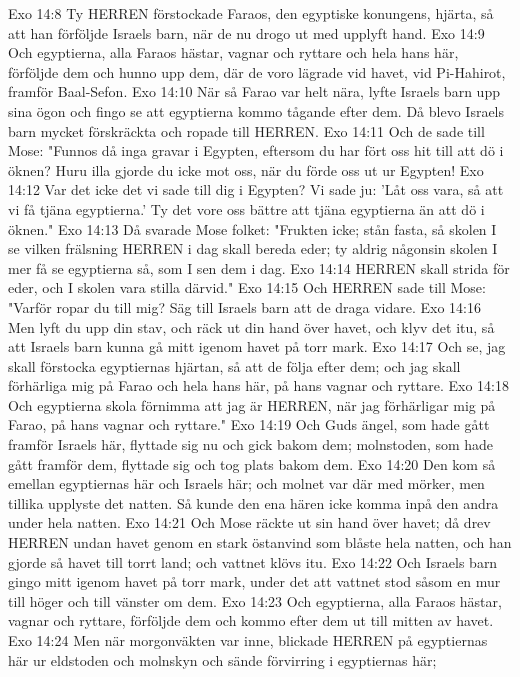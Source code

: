 Exo 14:8  Ty HERREN förstockade Faraos, den egyptiske konungens, hjärta, så att han förföljde Israels barn, när de nu drogo ut med upplyft hand.
Exo 14:9  Och egyptierna, alla Faraos hästar, vagnar och ryttare och hela hans här, förföljde dem och hunno upp dem, där de voro lägrade vid havet, vid Pi-Hahirot, framför Baal-Sefon.
Exo 14:10  När så Farao var helt nära, lyfte Israels barn upp sina ögon och fingo se att egyptierna kommo tågande efter dem. Då blevo Israels barn mycket förskräckta och ropade till HERREN.
Exo 14:11  Och de sade till Mose: "Funnos då inga gravar i Egypten, eftersom du har fört oss hit till att dö i öknen? Huru illa gjorde du icke mot oss, när du förde oss ut ur Egypten!
Exo 14:12  Var det icke det vi sade till dig i Egypten? Vi sade ju: 'Låt oss vara, så att vi få tjäna egyptierna.' Ty det vore oss bättre att tjäna egyptierna än att dö i öknen."
Exo 14:13  Då svarade Mose folket: "Frukten icke; stån fasta, så skolen I se vilken frälsning HERREN i dag skall bereda eder; ty aldrig någonsin skolen I mer få se egyptierna så, som I sen dem i dag.
Exo 14:14  HERREN skall strida för eder, och I skolen vara stilla därvid."
Exo 14:15  Och HERREN sade till Mose: "Varför ropar du till mig? Säg till Israels barn att de draga vidare.
Exo 14:16  Men lyft du upp din stav, och räck ut din hand över havet, och klyv det itu, så att Israels barn kunna gå mitt igenom havet på torr mark.
Exo 14:17  Och se, jag skall förstocka egyptiernas hjärtan, så att de följa efter dem; och jag skall förhärliga mig på Farao och hela hans här, på hans vagnar och ryttare.
Exo 14:18  Och egyptierna skola förnimma att jag är HERREN, när jag förhärligar mig på Farao, på hans vagnar och ryttare."
Exo 14:19  Och Guds ängel, som hade gått framför Israels här, flyttade sig nu och gick bakom dem; molnstoden, som hade gått framför dem, flyttade sig och tog plats bakom dem.
Exo 14:20  Den kom så emellan egyptiernas här och Israels här; och molnet var där med mörker, men tillika upplyste det natten. Så kunde den ena hären icke komma inpå den andra under hela natten.
Exo 14:21  Och Mose räckte ut sin hand över havet; då drev HERREN undan havet genom en stark östanvind som blåste hela natten, och han gjorde så havet till torrt land; och vattnet klövs itu.
Exo 14:22  Och Israels barn gingo mitt igenom havet på torr mark, under det att vattnet stod såsom en mur till höger och till vänster om dem.
Exo 14:23  Och egyptierna, alla Faraos hästar, vagnar och ryttare, förföljde dem och kommo efter dem ut till mitten av havet.
Exo 14:24  Men när morgonväkten var inne, blickade HERREN på egyptiernas här ur eldstoden och molnskyn och sände förvirring i egyptiernas här;
